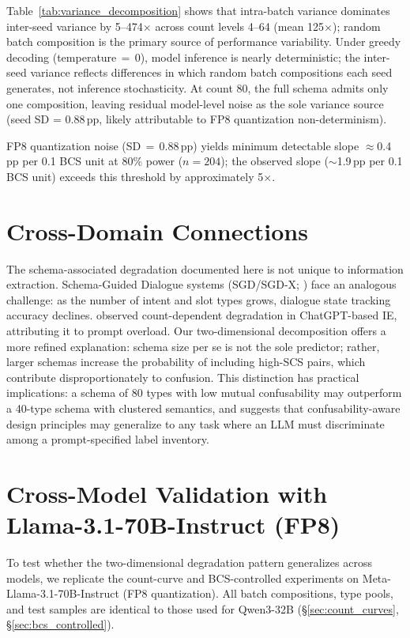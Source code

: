 \documentclass[11pt]{article}
\begin{document}
Table~\ref{tab:variance_decomposition} shows that intra-batch variance dominates inter-seed variance by 5--474$\times$ across count levels 4--64 (mean 125$\times$); random batch composition is the primary source of performance variability. Under greedy decoding (temperature${}\,=\,0$), model inference is nearly deterministic; the inter-seed variance reflects differences in which random batch compositions each seed generates, not inference stochasticity. At count 80, the full schema admits only one composition, leaving residual model-level noise as the sole variance source (seed SD = 0.88\,pp, likely attributable to FP8 quantization non-determinism).

FP8 quantization noise (SD${}\,=\,0.88$\,pp) yields minimum detectable slope $\approx$0.4\,pp per 0.1 BCS unit at 80\% power ($n = 204$); the observed slope (${\sim}$1.9\,pp per 0.1 BCS unit) exceeds this threshold by approximately 5$\times$.

\section{Cross-Domain Connections}
\label{app:cross-domain}

The schema-associated degradation documented here is not unique to information extraction. Schema-Guided Dialogue systems (SGD/SGD-X; \citealt{rastogi2020towards}) face an analogous challenge: as the number of intent and slot types grows, dialogue state tracking accuracy declines. \citet{li2023evaluating} observed count-dependent degradation in ChatGPT-based IE, attributing it to prompt overload. Our two-dimensional decomposition offers a more refined explanation: schema size per se is not the sole predictor; rather, larger schemas increase the probability of including high-SCS pairs, which contribute disproportionately to confusion. This distinction has practical implications: a schema of 80 types with low mutual confusability may outperform a 40-type schema with clustered semantics, and suggests that confusability-aware design principles may generalize to any task where an LLM must discriminate among a prompt-specified label inventory.

\section{Cross-Model Validation with Llama-3.1-70B-Instruct (FP8)}
\label{sec:appendix_cross_model_70b}

To test whether the two-dimensional degradation pattern generalizes across models, we replicate the count-curve and BCS-controlled experiments on Meta-Llama-3.1-70B-Instruct (FP8 quantization). All batch compositions, type pools, and test samples are identical to those used for Qwen3-32B (\S\ref{sec:count_curves}, \S\ref{sec:bcs_controlled}).
\end{document}

